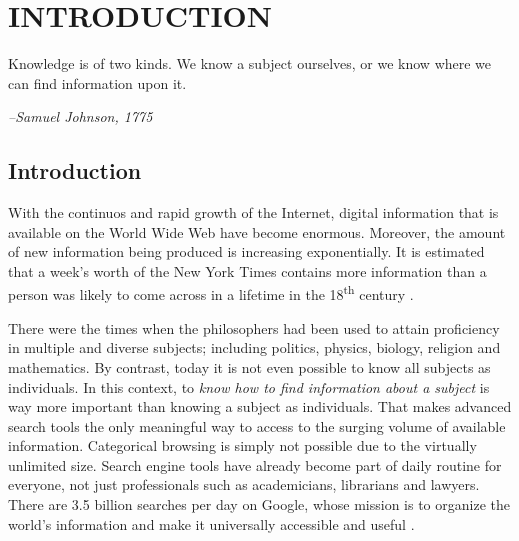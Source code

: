 %
%
%




\chapter{\textbf{INTRODUCTION}}
\label{ch1}

\renewcommand{\epigraphsize}{\bfseries\footnotesize}
\setlength{\epigraphwidth}{.48\textwidth}

\epigraph{Knowledge is of two kinds. We know a subject ourselves, or we know where we can find information upon it.}{\textit{--Samuel Johnson, 1775}}

\section{Introduction}
With the continuos and rapid growth of the Internet, digital information that is available on the World Wide Web have become enormous.
Moreover, the amount of new information being produced is increasing exponentially.
It is estimated that a week's worth of the New York Times contains more information than a person was likely to come across in a lifetime in the 18\textsuperscript{th} century \citep{ia}.

There were the times when the philosophers had been used to attain proficiency in multiple and diverse subjects; including politics, physics, biology, religion and mathematics.
By contrast, today it is not even possible to know all subjects as individuals. 
In this context, to \emph{know how to find information about a subject} is way more important than knowing a subject as individuals.
That makes advanced search tools the only meaningful way to access to the surging volume of available information. 
Categorical browsing is simply not possible due to the virtually unlimited size. 
Search engine tools have already become part of daily routine for everyone, not just professionals such as academicians, librarians and lawyers.
There are 3.5 billion searches per day on Google, whose mission is to organize the world's information and make it universally accessible and useful \citep{google}.

